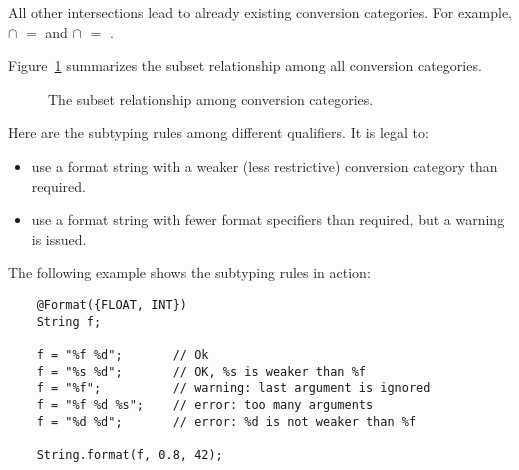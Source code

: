 \noindent All other intersections lead to already existing conversion categories.
For example,  $\cap$  $=$  and 
 $\cap$  $=$ .

Figure~\ref{fig:formatter-cat} summarizes the subset 
relationship among all conversion categories.

\begin{figure}[thbp]
    \caption{The subset relationship among conversion categories.}
    \label{fig:formatter-cat}
\end{figure}



% 

\label{formatter-format-subtyping}
Here are the subtyping rules among different  qualifiers.
It is legal to:

\begin{itemize}
\item use a format string with a weaker (less restrictive) conversion category than required.
\item use a format string with fewer format specifiers than required, but a warning is issued. 
\end{itemize}

The following example shows the subtyping rules in action:

\begin{Verbatim}
    @Format({FLOAT, INT}) 
    String f;

    f = "%f %d";       // Ok
    f = "%s %d";       // OK, %s is weaker than %f
    f = "%f";          // warning: last argument is ignored
    f = "%f %d %s";    // error: too many arguments
    f = "%d %d";       // error: %d is not weaker than %f

    String.format(f, 0.8, 42);
\end{Verbatim}

